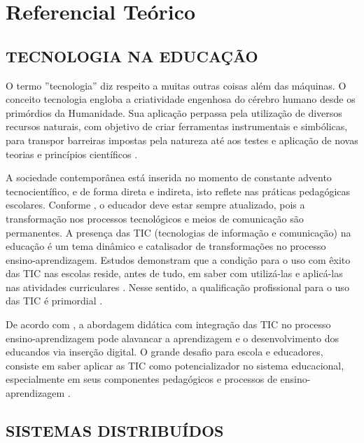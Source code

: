 
\chapter{\textbf{Referencial Teórico}} %
\sloppy %

\section{TECNOLOGIA NA EDUCAÇÃO }

O termo ''tecnologia'' diz respeito a muitas outras coisas além das máquinas. O conceito tecnologia engloba a criatividade engenhosa do cérebro humano desde os primórdios da Humanidade. Sua aplicação perpassa pela utilização de diversos recursos naturais, com objetivo de criar ferramentas instrumentais e simbólicas, para transpor barreiras impostas pela natureza até aos testes e aplicação de novas teorias e princípios científicos \cite{kenski2007educaccao}.

A sociedade contemporânea está inserida no momento de constante advento tecnocientífico, e de forma direta e indireta, isto reflete nas práticas pedagógicas escolares. Conforme , o educador deve estar sempre atualizado, pois a transformação nos processos tecnológicos e meios de comunicação são permanentes. A presença das TIC (tecnologias de informação e comunicação) na educação é um tema dinâmico e catalisador de transformações no processo ensino-aprendizagem. Estudos demonstram que a condição para o uso com êxito das TIC nas escolas reside, antes de tudo, em saber com utilizá-las e aplicá-las nas atividades curriculares \cite{noeth2004evaluating}. Nesse sentido, a qualificação profissional para o uso das TIC é primordial \cite{david2008padroes}.

De acordo com , a abordagem didática com integração das TIC no processo ensino-aprendizagem pode alavancar a aprendizagem e o desenvolvimento dos educandos via inserção digital. O grande desafio para escola e educadores, consiste em saber aplicar as TIC como potencializador no sistema educacional, especialmente em seus componentes pedagógicos e processos de ensino-aprendizagem \cite{libaneoorganizacao}.

\section{SISTEMAS DISTRIBUÍDOS}

